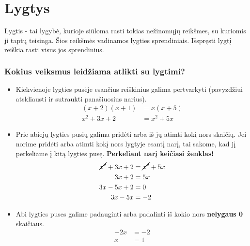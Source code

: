 \documentclass[12pt,a4paper]{report}
\numberwithin{table}{chapter}
\numberwithin{figure}{chapter}
\theoremstyle{definition}
\begin{document}
\tableofcontents
\thispagestyle{empty}

%


\setcounter{page}{2}


\newpage

\chapter{Lygtys} 
Lygtis - tai lygybė, kurioje siūloma rasti tokias nežinomųjų reikšmes, su kuriomis ji taptų teisinga. Šios reikšmės vadinamos lygties sprendiniais. Išspręsti lygtį reiškia rasti visus jos sprendinius.
\subsection*{Kokius veiksmus leidžiama atlikti su lygtimi?} \label{sec: lygtys}
\begin{itemize}
\item Kiekvienoje lygties pusėje esančius reiškinius galima pertvarkyti (pavyzdžiui atskliausti ir sutraukti panašiuosius narius).
\begin{align*}
(x+2)(x+1) &=x(x+5) \\
  x^2+3x+2 &=x^2+5x
\end{align*}
\item Prie abiejų lygties pusių galima pridėti arba iš jų atimti kokį nors skaičių. Jei norime pridėti arba atimti kokį nors lygtyje esantį narį, tai sakome, kad jį perkeliame į kitą lygties pusę. \textbf{Perkeliant narį keičiasi ženklas!}\label{sec:r2} 
\begin{align*}
\cancel{x^2}+3x+2 &=\cancel{x^2}+5x \\
3x+2 &=5x \\
 3x-5x+2 &=0 \\
3x-5x &=-2
\end{align*}
\item Abi lygties puses galime padauginti arba padalinti iš kokio nors \textbf{nelygaus 0} skaičiaus.
\begin{align*}
-2x &=-2 \\
x &= 1
\end{align*}
\end{itemize}
\end{document}
